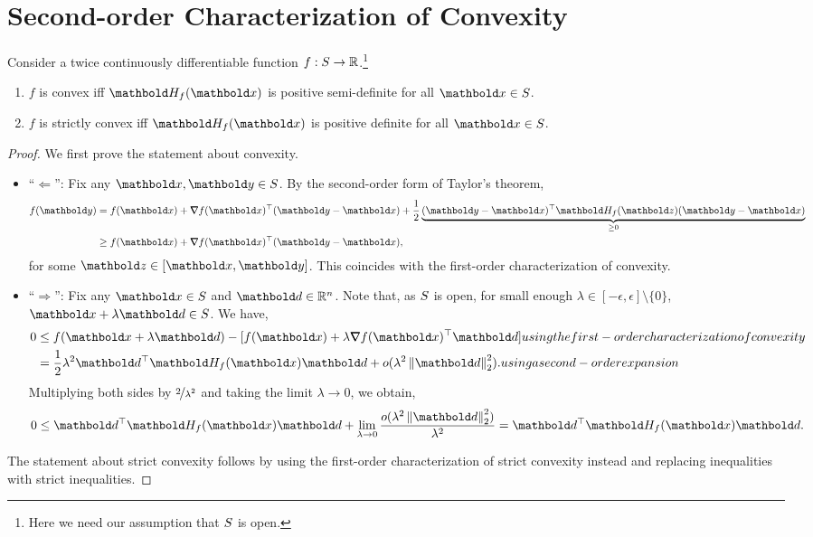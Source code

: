 \section{Second-order Characterization of Convexity}

\begin{thm} Consider a twice continuously differentiable function $f: S \to \mathbb{R}$.\footnote{Here we need our assumption that $S$ is open.} \begin{enumerate}
    \item $f$ is convex iff $\mH_f(\vx)$ is positive semi-definite for all $\vx \in \sS$.
    \item $f$ is strictly convex iff $\mH_f(\vx)$ is positive definite for all $\vx \in \sS$.
\end{enumerate}
\end{thm}
\begin{proof} We first prove the statement about convexity. \begin{itemize}
    \item ``$\Leftarrow$'': Fix any $\vx, \vy \in \sS$. By the second-order form of Taylor's theorem, \begin{align*}
        f(\vy) &= f(\vx) + \trans{\grad f(\vx)}(\vy - \vx) + \frac{1}{2}\underbrace{\trans{(\vy - \vx)}\mH_f(\vz)(\vy - \vx)}_{\geq 0} \\
        &\geq f(\vx) + \trans{\grad f(\vx)}(\vy - \vx),
    \end{align*} for some $\vz \in [\vx,\vy]$. This coincides with the first-order characterization of convexity.
    
    \item ``$\Rightarrow$'': Fix any $\vx \in \sS$ and $\vd \in \R^n$. Note that, as $S$ is open, for small enough $\lambda \in [-\epsilon,\epsilon] \setminus \{0\}$, $\vx + \lambda\vd \in \sS$. We have, \begin{align*}
        0 &\leq f(\vx + \lambda\vd) - [f(\vx) + \lambda \trans{\grad f(\vx)}\vd] \margintag{using the first-order characterization of convexity} \\
        &= \frac{1}{2}\lambda^2\trans{\vd}\mH_f(\vx)\vd + o(\lambda^2 \norm{\vd}_2^2). \margintag{using a second-order expansion}
    \end{align*} Multiplying both sides by $\nicefrac{2}{\lambda^2}$ and taking the limit $\lambda \to 0$, we obtain, \begin{align*}
        0 \leq \trans{\vd}\mH_f(\vx)\vd + \lim_{\lambda \to 0}\frac{o(\lambda^2 \norm{\vd}_2^2)}{\lambda^2} = \trans{\vd}\mH_f(\vx)\vd.
    \end{align*}
\end{itemize}

The statement about strict convexity follows by using the first-order characterization of strict convexity instead and replacing inequalities with strict inequalities.
\end{proof}